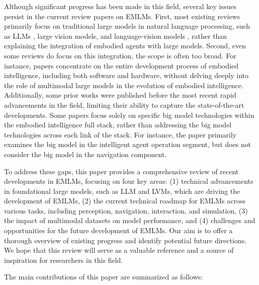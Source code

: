 Although significant progress has been made in this field, several key issues persist in the current review papers on EMLMs. First, most existing reviews primarily focus on traditional large models in natural language processing, such as LLMs \cite{zhao2023survey} \cite{chang2024survey} \cite{naveed2023comprehensive}, large vision models, and language-vision models \cite{li2024multimodal}, rather than explaining the integration of embodied agents with large models. Second, even some reviews do focus on this integration, the scope is often too broad. For instance, papers \cite{wu2024embodied} \cite{du2024advancements} \cite{liu2024aligning} \cite{roy2021machine} concentrate on the entire development process of embodied intelligence, including both software and hardware, without delving deeply into the role of multimodal large models in the evolution of embodied intelligence. Additionally, some prior works \cite{firoozi2023foundation} \cite{duan2022survey} \cite{xi2023rise} were published before the most recent rapid advancements in the field, limiting their ability to capture the state-of-the-art developments. Some papers focus solely on specific big model technologies within the embodied intelligence full stack, rather than addressing the big model technologies across each link of the stack. For instance, the paper \cite{ma2024survey} primarily examines the big model in the intelligent agent operation segment, but does not consider the big model in the navigation component.

To address these gaps, this paper provides a comprehensive review of recent developments in EMLMs, focusing on four key areas: (1) technical advancements in foundational large models, such as LLM and LVMs, which are driving the development of EMLMs, (2) the current technical roadmap for EMLMs across various tasks, including perception, navigation, interaction, and simulation, (3) the impact of multimodal datasets on model performance, and (4) challenges and opportunities for the future development of EMLMs. Our aim is to offer a thorough overview of existing progress and identify potential future directions. We hope that this review will serve as a valuable reference and a source of inspiration for researchers in this field.

The main contributions of this paper are summarized as follows:

